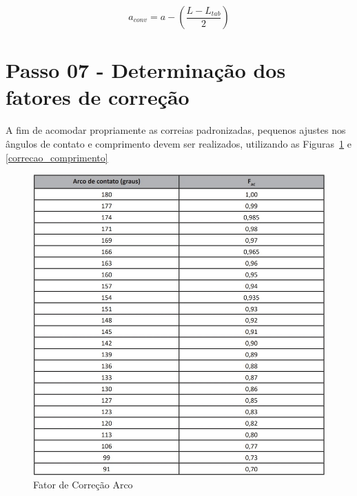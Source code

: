 \begin{equation}
    a_{conv}=a-\left(\frac{L-L_{tab}}{2}\right)     \label{deixo}
\end{equation}


\section{Passo 07 - Determinação dos fatores de correção}

A fim de acomodar propriamente as correias padronizadas, pequenos ajustes nos ângulos de contato e comprimento devem ser realizados, utilizando as Figuras~\ref{correcao_arco} e \ref{correcao_comprimento}


\begin{figure}[h]
	\centering
	\caption{Fator de Correção Arco}
    \label{correcao_arco}
	\includegraphics[scale=0.7]{Imagens/correcao_arco.png}
\end{figure}


